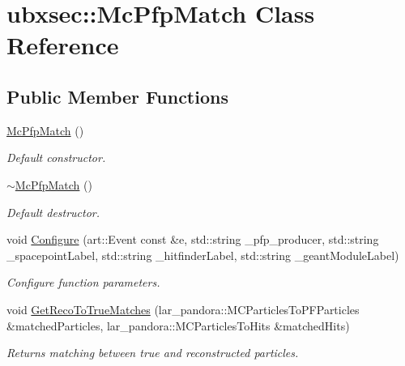 \hypertarget{classubxsec_1_1McPfpMatch}{\section{ubxsec\-:\-:Mc\-Pfp\-Match Class Reference}
\label{classubxsec_1_1McPfpMatch}
}
\subsection*{Public Member Functions}
\begin{DoxyCompactItemize}
\item 
\hypertarget{classubxsec_1_1McPfpMatch_aea3e9923fdf8855d5798015b36f2d516}{\hyperlink{classubxsec_1_1McPfpMatch_aea3e9923fdf8855d5798015b36f2d516}{Mc\-Pfp\-Match} ()}\label{classubxsec_1_1McPfpMatch_aea3e9923fdf8855d5798015b36f2d516}

\begin{DoxyCompactList}\small\item\em Default constructor. \end{DoxyCompactList}\item 
\hypertarget{classubxsec_1_1McPfpMatch_a3fa822d7321aca21a0ad42e692a29bf2}{\hyperlink{classubxsec_1_1McPfpMatch_a3fa822d7321aca21a0ad42e692a29bf2}{$\sim$\-Mc\-Pfp\-Match} ()}\label{classubxsec_1_1McPfpMatch_a3fa822d7321aca21a0ad42e692a29bf2}

\begin{DoxyCompactList}\small\item\em Default destructor. \end{DoxyCompactList}\item 
\hypertarget{classubxsec_1_1McPfpMatch_a15cea806e5a1b12bf2e187d5d26c528d}{void \hyperlink{classubxsec_1_1McPfpMatch_a15cea806e5a1b12bf2e187d5d26c528d}{Configure} (art\-::\-Event const \&e, std\-::string \-\_\-pfp\-\_\-producer, std\-::string \-\_\-spacepoint\-Label, std\-::string \-\_\-hitfinder\-Label, std\-::string \-\_\-geant\-Module\-Label)}\label{classubxsec_1_1McPfpMatch_a15cea806e5a1b12bf2e187d5d26c528d}

\begin{DoxyCompactList}\small\item\em Configure function parameters. \end{DoxyCompactList}\item 
void \hyperlink{classubxsec_1_1McPfpMatch_a1b66ef44f3a1772a4e72de2e5066768c}{Get\-Reco\-To\-True\-Matches} (lar\-\_\-pandora\-::\-M\-C\-Particles\-To\-P\-F\-Particles \&matched\-Particles, lar\-\_\-pandora\-::\-M\-C\-Particles\-To\-Hits \&matched\-Hits)
\begin{DoxyCompactList}\small\item\em Returns matching between true and reconstructed particles. \end{DoxyCompactList}\end{DoxyCompactItemize}
